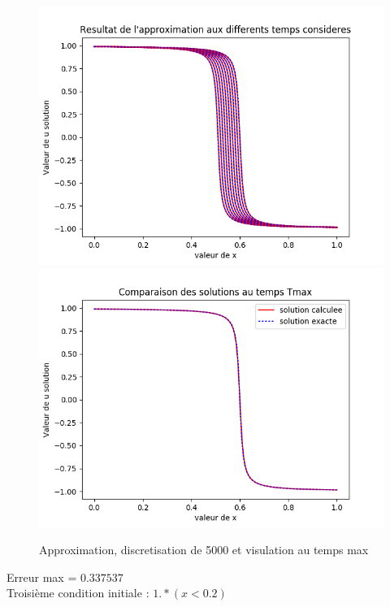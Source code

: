 \documentclass[12pt]{article}
\begin{document}
 \begin{figure}[H]
	\centering
	\includegraphics[scale=0.45]{1D_c1_5000_s1_init2.png}
	\includegraphics[scale=0.45]{Temp_max_c1_5000_s1_i2.png}
	\caption{Approximation, discretisation de 5000 et visulation au temps max}
	\label{1D} 
	\end{figure}
Erreur max = $0.337537$
\\Troisième condition initiale : $1.*(x<0.2)$
\end{document}
